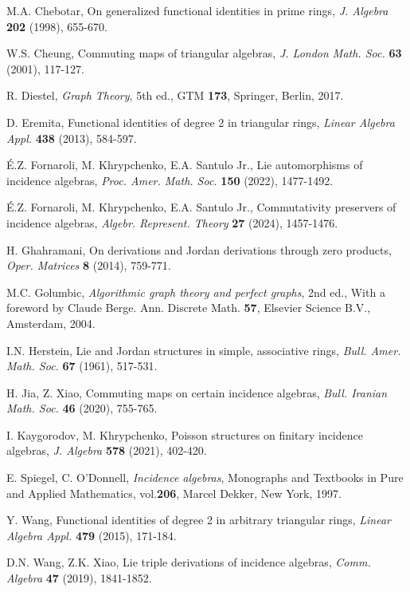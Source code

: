 \documentclass[reqno]{amsart}
\numberwithin{equation}{section}
\theoremstyle{plain}
\theoremstyle{definition}
\begin{document}
\begin{thebibliography}{}
 M.A. Chebotar, On generalized functional identities in prime rings,
{\em J. Algebra} {\bf 202} (1998), 655-670.

 W.S. Cheung, Commuting maps of triangular algebras,
{\em J. London Math. Soc.} {\bf 63} (2001), 117-127.

 R. Diestel, \emph{Graph Theory}, 5th ed., GTM {\bf 173},
Springer, Berlin, 2017.

 D. Eremita, Functional identities of degree 2 in triangular rings,
{\em Linear Algebra Appl.} {\bf 438} (2013), 584-597.

 \'{E}.Z. Fornaroli, M. Khrypchenko, E.A. Santulo Jr., Lie automorphisms of incidence algebras,
{\em Proc. Amer. Math. Soc.} {\bf 150} (2022), 1477-1492.

 \'{E}.Z. Fornaroli, M. Khrypchenko, E.A. Santulo Jr., Commutativity preservers of incidence algebras,
{\em Algebr. Represent. Theory} {\bf 27} (2024), 1457-1476.

 H. Ghahramani, On derivations and Jordan derivations through zero products,
{\em Oper. Matrices} {\bf 8} (2014), 759-771.

 M.C. Golumbic, {\em Algorithmic graph theory and perfect graphs}, 2nd ed.,
With a foreword by Claude Berge. Ann. Discrete Math. \textbf{57}, Elsevier Science B.V., Amsterdam, 2004.


 I.N. Herstein, Lie and Jordan structures in simple, associative rings,
{\em Bull. Amer. Math. Soc.} {\bf 67} (1961), 517-531.

 H. Jia, Z. Xiao, Commuting maps on certain incidence algebras,
{\em Bull. Iranian Math. Soc.} {\bf 46} (2020), 755-765.

 I. Kaygorodov, M. Khrypchenko, Poisson structures on finitary incidence algebras,
{\em J. Algebra} {\bf 578} (2021), 402-420.

 E. Spiegel, C. O'Donnell, {\em Incidence algebras},
Monographs and Textbooks in Pure and Applied Mathematics, vol.\textbf{206}, Marcel Dekker,
New York, 1997.

 Y. Wang, Functional identities of degree 2 in arbitrary triangular rings,
{\em Linear Algebra Appl.} {\bf 479} (2015), 171-184.

 D.N. Wang, Z.K. Xiao, Lie triple derivations of incidence algebras,
{\em Comm. Algebra} {\bf 47} (2019), 1841-1852.


\end{thebibliography}
\end{document}
